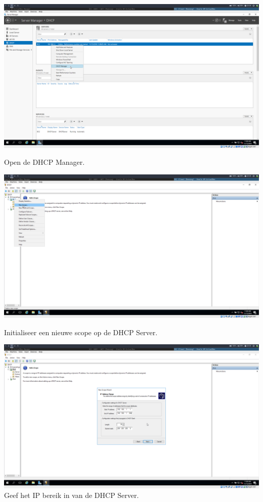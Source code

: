 \documentclass[a4paper]{article}
\begin{document}
\begin{center}
	\includegraphics[width=15cm]{Pictures/DC2/DHCP/1542308921.png}
	
	Open de DHCP Manager.
\end{center}
\begin{center}
	\includegraphics[width=15cm]{Pictures/DC2/DHCP/1542308937.png}
	
	Initialiseer een nieuwe scope op de DHCP Server.
\end{center}
\begin{center}
	\includegraphics[width=15cm]{Pictures/DC2/DHCP/1542308958.png}
	Geef het IP bereik in van de DHCP Server.
\end{center}
\end{document}
